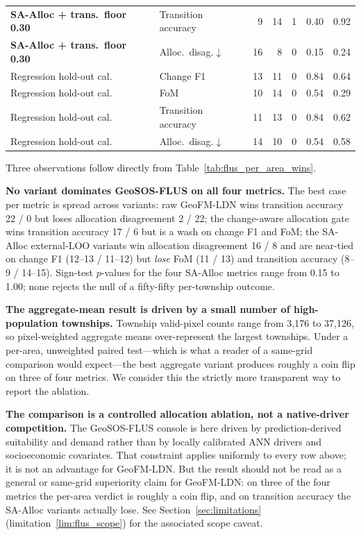\documentclass{article}
\begin{document}
\begin{table}[htbp]
{\begin{tabular}{@{}llrrrrr@{}}
\textbf{SA-Alloc + trans.\ floor 0.30} & Transition accuracy     & 9  & 14 & 1 & 0.40 & 0.92 \\
\textbf{SA-Alloc + trans.\ floor 0.30} & Alloc.\ disag.$\downarrow$ & 16 & 8  & 0 & 0.15 & 0.24 \\
\midrule
Regression hold-out cal.\ & Change F1               & 13 & 11 & 0 & 0.84 & 0.64 \\
Regression hold-out cal.\ & FoM                     & 10 & 14 & 0 & 0.54 & 0.29 \\
Regression hold-out cal.\ & Transition accuracy     & 11 & 13 & 0 & 0.84 & 0.62 \\
Regression hold-out cal.\ & Alloc.\ disag.$\downarrow$ & 14 & 10 & 0 & 0.54 & 0.58 \\
\bottomrule
\end{tabular}}
\end{table}

Three observations follow directly from Table~\ref{tab:flus_per_area_wins}.

\textbf{No variant dominates GeoSOS-FLUS on all four metrics.} The best case per metric is spread across variants: raw GeoFM-LDN wins transition accuracy 22 / 0 but loses allocation disagreement 2 / 22; the change-aware allocation gate wins transition accuracy 17 / 6 but is a wash on change F1 and FoM; the SA-Alloc external-LOO variants win allocation disagreement 16 / 8 and are near-tied on change F1 (12--13 / 11--12) but \emph{lose} FoM (11 / 13) and transition accuracy (8--9 / 14--15). Sign-test $p$-values for the four SA-Alloc metrics range from 0.15 to 1.00; none rejects the null of a fifty-fifty per-township outcome.

\textbf{The aggregate-mean result is driven by a small number of high-population townships.} Township valid-pixel counts range from 3{,}176 to 37{,}126, so pixel-weighted aggregate means over-represent the largest townships. Under a per-area, unweighted paired test---which is what a reader of a same-grid comparison would expect---the best aggregate variant produces roughly a coin flip on three of four metrics. We consider this the strictly more transparent way to report the ablation.

\textbf{The comparison is a controlled allocation ablation, not a native-driver competition.} The GeoSOS-FLUS console is here driven by prediction-derived suitability and demand rather than by locally calibrated ANN drivers and socioeconomic covariates. That constraint applies uniformly to every row above; it is not an advantage for GeoFM-LDN. But the result should not be read as a general or same-grid superiority claim for GeoFM-LDN: on three of the four metrics the per-area verdict is roughly a coin flip, and on transition accuracy the SA-Alloc variants actually lose. See Section~\ref{sec:limitations} (limitation~\ref{lim:flus_scope}) for the associated scope caveat.
\end{document}
